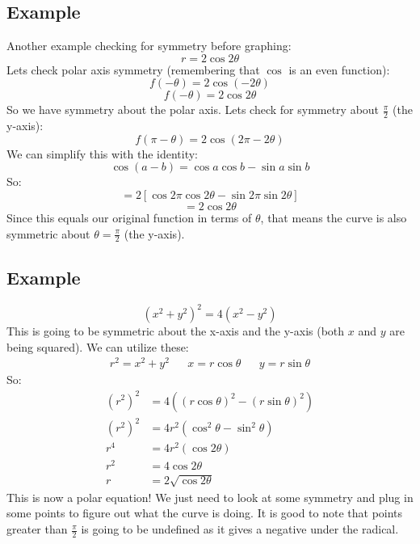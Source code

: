 \documentclass{report}
\begin{document}
    \subsection{Example}
        Another example checking for symmetry before graphing:
        \[r = 2 \cos 2 \theta\]
        Lets check polar axis symmetry (remembering that \(\cos\) is an even function):
        \[f(- \theta) = 2 \cos (- 2 \theta)\]
        \[f(- \theta) = 2 \cos 2 \theta\]
        So we have symmetry about the polar axis.
        Lets check for symmetry about \(\frac{\pi}{2}\) (the y-axis):
        \[f(\pi - \theta) = 2 \cos (2 \pi - 2 \theta)\]
        We can simplify this with the identity:
        \[\cos (a - b) = \cos a \cos b - \sin a \sin b\]
        So:
        \[= 2 \left[ \cos 2 \pi \cos 2 \theta - \sin 2 \pi \sin 2 \theta\right]\]
        \[= 2 \cos 2 \theta\]
        Since this equals our original function in terms of \(\theta\), that means the curve is also symmetric about \(\theta = \frac{\pi}{2}\) (the y-axis).
        
    \subsection{Example}
        \[(x^2 + y^2)^2 = 4(x^2 - y^2)\]
        This is going to be symmetric about the x-axis and the y-axis (both \(x\) and \(y\) are being squared).
        We can utilize these:
        \begin{align*}
            r^2 = x^2 + y^2 &&
            x = r \cos \theta &&
            y = r \sin \theta
        \end{align*} 
        So:
        \begin{align*}
            (r^2)^2 &= 4 \left( (r \cos \theta) ^2 - (r \sin \theta)^2\right) \\
            (r^2)^2 &= 4 r^2 (\cos^2 \theta - \sin^2 \theta) \\
            r^4 &= 4r^2 (\cos 2 \theta) \\
            r^2 &= 4 \cos 2 \theta \\
            r &= 2 \sqrt{\cos 2 \theta}
        \end{align*}
        This is now a polar equation!
        We just need to look at some symmetry and plug in some points to figure out what the curve is doing.
        It is good to note that points greater than \(\frac{\pi}{2}\) is going to be undefined as it gives a negative under the radical.
        
\end{document}
